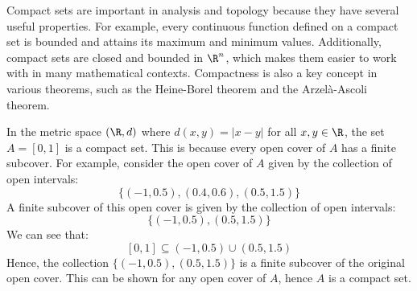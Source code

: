 \documentclass[openany]{book}
\begin{document}
\begin{mynote}
 Compact sets are important in analysis and topology because they have several useful properties. For example, every continuous function defined on a compact set is bounded and attains its maximum and minimum values. Additionally, compact sets are closed and bounded in $\R^n$, which makes them easier to work with in many mathematical contexts. Compactness is also a key concept in various theorems, such as the Heine-Borel theorem and the Arzelà-Ascoli theorem.
\end{mynote}
\begin{example}
    In the metric space $(\R, d)$ where $d(x, y) = |x - y|$ for all $x, y \in \R$, the set $A = [0, 1]$ is a compact set. This is because every open cover of $A$ has a finite subcover. For example, consider the open cover of $A$ given by the collection of open intervals:
    $$\{(-1, 0.5), (0.4, 0.6), (0.5, 1.5)\}$$
    A finite subcover of this open cover is given by the collection of open intervals:
    $$\{(-1, 0.5), (0.5, 1.5)\}$$
    We can see that:
    $$[0, 1] \subseteq (-1, 0.5) \cup (0.5, 1.5)$$
    Hence, the collection $\{(-1, 0.5), (0.5, 1.5)\}$ is a finite subcover of the original open cover. This can be shown for any open cover of $A$, hence $A$ is a compact set.
\end{example}
\end{document}
